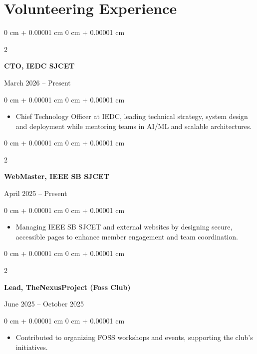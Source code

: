 \documentclass[10pt, a4paper]{article}
\newenvironment{highlights}{
    \begin{itemize}[
        topsep=0.10 cm,
        parsep=0.10 cm,
        partopsep=0pt,
        itemsep=0pt,
        leftmargin=0 cm + 10pt
    ]
}{
    \end{itemize}
} %
\newenvironment{onecolentry}{
    \begin{adjustwidth}{
        0 cm + 0.00001 cm
    }{
        0 cm + 0.00001 cm
    }
}{
    \end{adjustwidth}
} %
\newenvironment{twocolentry}[2][]{
    \onecolentry
    \def\secondColumn{#2}
    \setcolumnwidth{\fill, 4.5 cm}
    \begin{paracol}{2}
}{
    \switchcolumn \raggedleft \secondColumn
    \end{paracol}
    \endonecolentry
} %
\begin{document}
    \section{Volunteering Experience}

    \vspace{0.2 cm}

    \begin{twocolentry}{
        March 2026 – Present
    }
        \textbf{CTO, IEDC SJCET}
    \end{twocolentry}
    
    \vspace{0.10 cm}
    \begin{onecolentry}
        \begin{highlights}
            \item Chief Technology Officer at IEDC, leading technical strategy, system design and deployment while mentoring teams in AI/ML and scalable architectures.
        \end{highlights}
    \end{onecolentry}
    
    \vspace{0.2 cm}
    
    \begin{twocolentry}{
        April 2025 – Present
    }
        \textbf{WebMaster, IEEE SB SJCET}
    \end{twocolentry}
    
    \vspace{0.10 cm}
    \begin{onecolentry}
        \begin{highlights}
            \item Managing IEEE SB SJCET and external websites by designing secure, accessible pages to enhance member engagement and team coordination.
        \end{highlights}
    \end{onecolentry}
    
    \vspace{0.2 cm}
    
    \begin{twocolentry}{
        June 2025 – October 2025
    }
        \textbf{Lead, TheNexusProject (Foss Club)}
    \end{twocolentry}
    
    \vspace{0.10 cm}
    \begin{onecolentry}
        \begin{highlights}
            \item Contributed to organizing FOSS workshops and events, supporting the club's initiatives.
        \end{highlights}
    \end{onecolentry}
    
\end{document}
